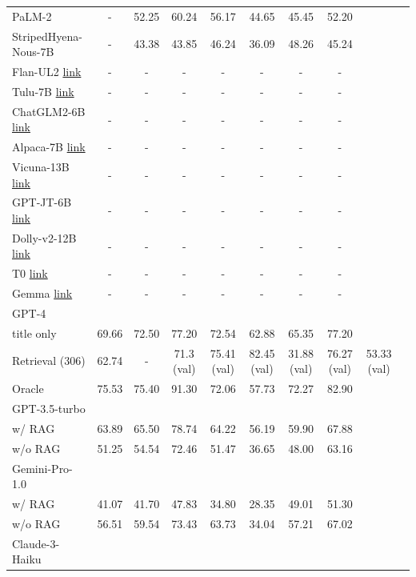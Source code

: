 \begin{table}[hbt!]
\begin{tabular}{@{}lccccccccc@{}}
PaLM-2 & - & 52.25 & 60.24 & 56.17 & 44.65 & 45.45 & 52.20\\
StripedHyena-Nous-7B & - & 43.38 & 43.85 & 46.24&36.09&48.26&45.24\\
%
Flan-UL2 \href{https://huggingface.co/google/flan-ul2}{link}  & - & - & - & - & -& - & -    \\
%
Tulu-7B \href{https://huggingface.co/allenai/tulu-7b}{link}  & - & - & - & - & -& - & -    \\
%
ChatGLM2-6B \href{https://github.com/THUDM/ChatGLM2-6B/blob/main/README_EN.md}{link}  & - & - & - & - & -& - & -    \\
%
Alpaca-7B \href{https://github.com/tatsu-lab/stanford_alpaca}{link}  & - & - & - & - & -& - & -   \\
%
Vicuna-13B \href{https://huggingface.co/lmsys/vicuna-13b-v1.3}{link}  & - & - & - & - & -& - & -    \\
%
GPT-JT-6B \href{https://huggingface.co/togethercomputer/GPT-JT-6B-v1}{link}  & - & - & - & - & -& - & -   \\
%
Dolly-v2-12B \href{https://huggingface.co/databricks/dolly-v2-12b}{link}  & - & - & - & - & -& - & -    \\
%
T0 \href{https://huggingface.co/bigscience/T0}{link}  & - & - & - & - & -& - & -    \\
%
Gemma  \href{https://blog.google/technology/developers/gemma-open-models/}{link} & - & - & - & - & -& - & -    \\

\addlinespace[0.1em]\hdashline\addlinespace[0.1em]
%
\rowcolor{lavender} GPT-4   &  &  &  &  & &  &     \\
\quad \quad title only  & 69.66 & 72.50 & 77.20 & 72.54 & 62.88 &  65.35  & 77.20 \\
\quad \quad Retrieval (306) & 62.74 & - & 71.3 (val) & 75.41 (val) & 82.45 (val) & 31.88 (val) & 76.27 (val) & 53.33 (val)\\
\quad \quad Oracle   & 75.53 & 75.40 & 91.30 & 72.06 & 57.73 &  72.27  & 82.90 \\

%
\rowcolor{lavender} GPT-3.5-turbo   &  &  &  &  &  &  &     \\
\quad \quad w/ RAG    & 63.89 & 65.50 & 78.74 & 64.22 & 56.19 & 59.90  &  67.88 \\
\quad \quad w/o RAG   & 51.25 & 54.54 & 72.46 & 51.47 & 36.65 & 48.00 & 63.16    \\

%
\rowcolor{lavender} Gemini-Pro-1.0  &  &  &  &  &  &  &  \\
\quad \quad w/ RAG   & 41.07 & 41.70 & 47.83 & 34.80 & 28.35 & 49.01  & 51.30 \\
\quad \quad w/o RAG   & 56.51 & 59.54 & 73.43 & 63.73 & 34.04 &  57.21 & 67.02 \\
%
 Claude-3-Haiku  &  &  &  & & &  &     \\


\end{tabular}
\end{table}
